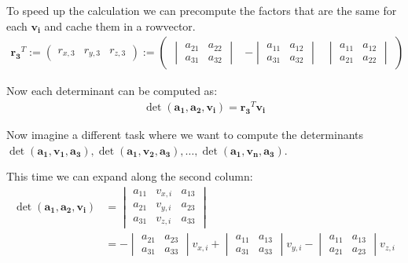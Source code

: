 \documentclass{article}
\newcommand{\vctr}[1]{\mathbf{#1}}
\newcommand{\rowvec}[1]{\begin{pmatrix}#1\end{pmatrix}}
\newcommand{\matCol}[1]{\vctr{a_{#1}}}
\begin{document}
To speed up the calculation we can precompute the factors that are the same for each \(\vctr{v_i}\) and cache them in a rowvector.
\begin{align*}
\vctr{r_3}^T := \rowvec{r_{x, 3} & r_{y, 3} & r_{z, 3}} := 
\rowvec{
\begin{vmatrix}
a_{21} & a_{22} \\
a_{31} & a_{32}
\end{vmatrix} &
- \begin{vmatrix}
a_{11} & a_{12} \\
a_{31} & a_{32}
\end{vmatrix} &
\begin{vmatrix}
a_{11} & a_{12} \\
a_{21} & a_{22}
\end{vmatrix}}
\end{align*}

Now each determinant can be computed as:
\begin{align*}
\det(\matCol{1}, \matCol{2}, \vctr{v_i}) = \vctr{r_3}^T \vctr{v_i}
\end{align*}

Now imagine a different task where we want to compute the determinants \(\det(\matCol{1}, \vctr{v_1}, \matCol{3}), \det(\matCol{1}, \vctr{v_2}, \matCol{3}), \dots, \det(\matCol{1}, \vctr{v_n}, \matCol{3})\).

This time we can expand along the second column:
\begin{align*}
\det(\matCol{1}, \matCol{2}, \vctr{v_i}) &= 
\begin{vmatrix}
a_{11} & v_{x, i} & a_{13} \\
a_{21} & v_{y, i} & a_{23} \\
a_{31} & v_{z, i} & a_{33} 
\end{vmatrix} \\
&= -\begin{vmatrix}
a_{21} & a_{23} \\
a_{31} & a_{33}
\end{vmatrix} v_{x, i}
+ \begin{vmatrix}
a_{11} & a_{13} \\
a_{31} & a_{33}
\end{vmatrix} v_{y, i}
- \begin{vmatrix}
a_{11} & a_{13} \\
a_{21} & a_{23}
\end{vmatrix} v_{z, i}
\end{align*}
\end{document}
